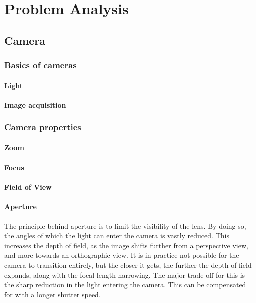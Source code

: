\chapter{Problem Analysis}


\section{Camera} \label{sec:Camera}
\subsection{Basics of cameras}
\subsubsection{Light}
\subsubsection{Image acquisition}

\subsection{Camera properties}
\subsubsection{Zoom}
\subsubsection{Focus}
\subsubsection{Field of View}
\subsubsection{Aperture}
The principle behind aperture is to limit the visibility of the lens. By doing so, the angles of which the light can enter the camera is vastly reduced. This increases the depth of field, as the image shifts further from a perspective view, and more towards an orthographic view. It is in practice not possible for the camera to transition entirely, but the closer it gets, the further the depth of field expands, along with the focal length narrowing. The major trade-off for this is the sharp reduction in the light entering the camera. This can be compensated for with a longer shutter speed.
